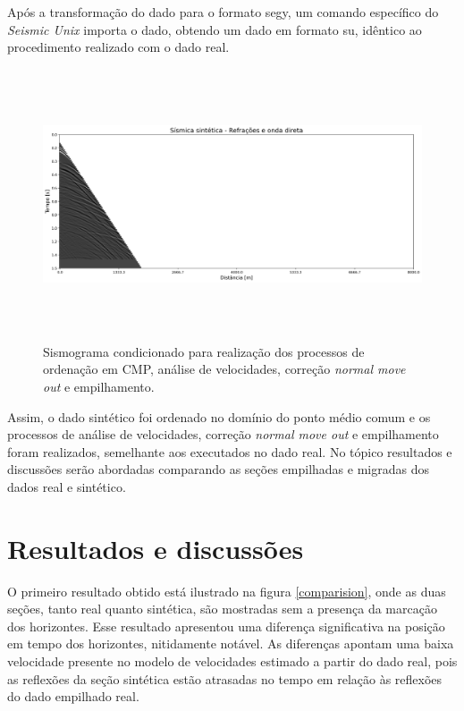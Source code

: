 \documentclass[
	12pt,				%
	openright,			%
	oneside,			%
	a4paper,			%
	english,			%
	brazil				%
	]{abntex2}
\begin{document}
	Após a transformação do dado para o formato segy, um comando específico do \textit{Seismic Unix} importa o dado, obtendo um dado em formato su, idêntico ao procedimento realizado com o dado real. 

	\begin{figure}[htp!]
		\centering
		\includegraphics[width=16cm,height=8cm]{../imagens/sismicaMute.png}
		\caption{Sismograma condicionado para realização dos processos de ordenação em CMP, análise de velocidades, correção \textit{normal move out} e empilhamento.}
		\label{sismicaMute}
	\end{figure}
	
	Assim, o dado sintético foi ordenado no domínio do ponto médio comum e os processos de análise de velocidades, correção \textit{normal move out} e empilhamento foram realizados, semelhante aos executados no dado real. No tópico resultados e discussões serão abordadas comparando as seções empilhadas e migradas dos dados real e sintético.   

\chapter{Resultados e discussões}

	O primeiro resultado obtido está ilustrado na figura \ref{comparision}, onde as duas seções, tanto real quanto sintética, são mostradas sem a presença da marcação dos horizontes. Esse resultado apresentou uma diferença significativa na posição em tempo dos horizontes, nitidamente notável. As diferenças apontam uma baixa velocidade presente no modelo de velocidades estimado a partir do dado real, pois as reflexões da seção sintética estão atrasadas no tempo em relação às reflexões do dado empilhado real.
\end{document}
